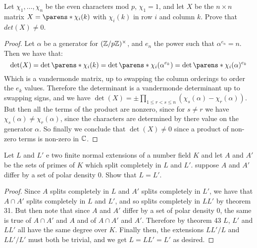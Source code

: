 \documentclass[11pt]{article}
\begin{document}

Let $\chi_1, \dots, \chi_n$ be the even characters mod $p$, $\chi_1 = 1$, and let $X$ be the $n \times n$ matrix $X = \parens*{\chi_i(k)}$ with $\chi_i(k)$ in row $i$ and column $k$.
Prove that $det(X) \ne 0$.

\begin{proof}
  Let $\alpha$ be a generator for $(\mathbb{Z}/p\mathbb{Z})^\times$, and $e_n$ the power such that $\alpha^{e_n} = n$.
  Then we have that:
  \begin{equation*}
    \det(X) = \det \parens*{\chi_i(k)}
    = \det \parens*{\chi_i(\alpha^{e_k})}
    = \det \parens*{\chi_i(\alpha)^{e_k}}
  \end{equation*}
  Which is a vandermonde matrix, up to swapping the column orderings to order the $e_k$ values.
  Therefore the determinant is a vandermonde determinant up to swapping signs, and we have $\det(X) = \pm \prod_{1 \le r < s \le n} (\chi_s(\alpha) - \chi_r(\alpha))$.
  But then all the terms of the product are nonzero, since for $s \ne r$ we have $\chi_s(\alpha) \ne \chi_r(\alpha)$, since the characters are determined by there value on the generator $\alpha$.
  So finally we conclude that $\det(X) \ne 0$ since a product of non-zero terms is non-zero in $\mathbb{C}$.
\end{proof}


Let $L$ and $L'$ e two finite normal extensions of a number field $K$ and let $A$ and $A'$ be the sets of primes of $K$ which split completely in $L$ and $L'$. suppose $A$ and $A'$ differ by a set of polar density $0$. Show that $L = L'$.
\begin{proof}
  Since $A$ splits completely in $L$ and $A'$ splits completely in $L'$, we have that $A \cap A'$ splits completely in $L$ and $L'$, and so splits completely in $LL'$ by theorem 31.
  But then note that since $A$ and $A'$ differ by a set of polar density $0$, the same is true of $A \cap A'$ and $A$ and of $A \cap A'$ and $A'$.
  Therefore by theorem 43 $L$, $L'$ and $LL'$ all have the same degree over $K$.
  Finally then, the extensions $LL'/L$ and $LL'/L'$ must both be trivial, and we get $L = LL' = L'$ as desired.
\end{proof}
\end{document}
